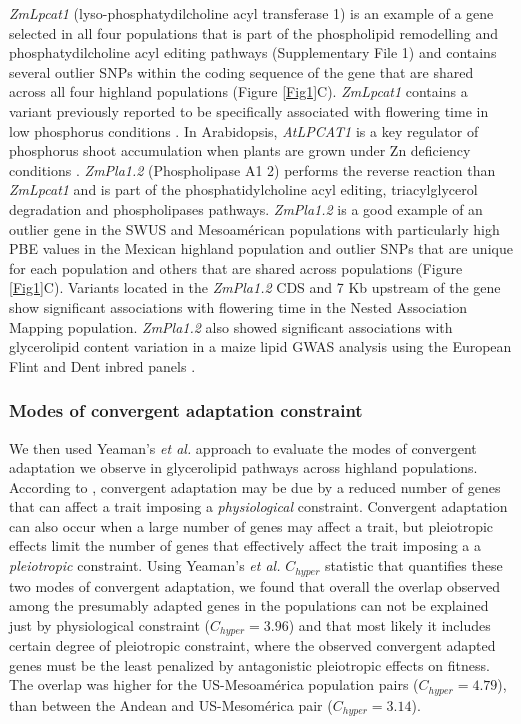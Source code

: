 \documentclass[9pt,twocolumn,twoside]{BioRxiv}
\begin{document}
\textit{ZmLpcat1} (lyso-phosphatydilcholine acyl transferase 1) is an example of a gene selected in all four populations that is part of the phospholipid remodelling and phosphatydilcholine acyl editing pathways (Supplementary File 1) and contains several outlier SNPs within the coding sequence of the gene that are shared across all four highland populations (Figure \ref{Fig1}C). \textit{ZmLpcat1} contains a variant previously reported to be specifically associated with flowering time in low phosphorus conditions \cite{xu2018a}. 
In Arabidopsis, \textit{AtLPCAT1} is a key regulator of phosphorus shoot accumulation when plants are grown under Zn deficiency conditions \cite{Kisko2018-zm}.
\textit{ZmPla1.2} (Phospholipase A1 2) performs the reverse reaction than \textit{ZmLpcat1} and is part of the phosphatidylcholine acyl editing, triacylglycerol degradation and phospholipases pathways. 
\textit{ZmPla1.2} is a good example of an outlier gene in the SWUS and Mesoamérican populations with particularly high PBE values in the Mexican highland population and outlier SNPs that are unique for each population and others that are shared across populations (Figure \ref{Fig1}C). 
Variants located in the \textit{ZmPla1.2} CDS \cite{Chen2012-gg} and 7 Kb upstream  of the gene \cite{Hung2012-ms} show significant associations with flowering time in the Nested Association Mapping population. \textit{ZmPla1.2} also showed significant associations with glycerolipid content variation in a maize lipid GWAS analysis using the European Flint and Dent inbred panels \cite{Riedelsheimer2013-bd}.

\subsubsection{Modes of convergent adaptation constraint} 
We then used Yeaman's \textit{et al.} \cite{yeaman2018} approach to evaluate the modes of convergent adaptation we observe in glycerolipid pathways across highland populations. 
According to \cite{yeaman2018}, convergent adaptation may be due by a reduced number of genes that can affect a trait imposing a \textit{physiological} constraint. 
Convergent adaptation can also occur when a large number of genes may affect a trait, but pleiotropic effects limit the number of genes that effectively affect the trait imposing a a \textit{pleiotropic} constraint. 
Using Yeaman's \textit{et al.} $C_{hyper}$ statistic \cite{yeaman2018} that quantifies these two modes of convergent adaptation, we found that overall the overlap observed among the presumably adapted genes in the populations can not be explained just by physiological constraint ($C_{hyper} = 3.96$) and that most likely it includes certain degree of pleiotropic constraint, where the observed convergent adapted genes must be the least penalized by antagonistic pleiotropic effects on fitness.
The overlap was higher for the US-Mesoamérica population pairs ($C_{hyper} = 4.79$), than between the Andean and US-Mesomérica pair ($C_{hyper} = 3.14$).
\end{document}
